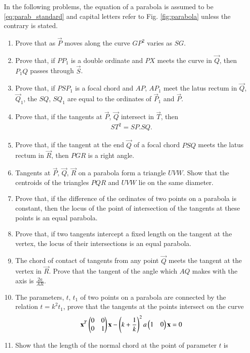In the following problems, the equation of a parabola is assumed to be \eqref{eq:parab_standard}
and capital letters refer to Fig. \ref{fig:parabola} unless the contrary is stated.
\renewcommand{\theequation}{\theenumi}
\begin{enumerate}[label=\arabic*.,ref=\thesubsection.\theenumi]
\item Prove that as $\vec{P}$ moves along the curve $GP^2$ varies as $SG$.
\item Prove that, if $PP_1$ is a double ordinate and $PX$ meets the curve in $\vec{Q}$,
then $P_1Q$ passes through $\vec{S}$.
\item Prove that, if $PSP_1$ is a focal chord and $AP$, $AP_1$ meet the latus rectum in $\vec{Q}$, $\vec{Q}_1$,
the $SQ$, $SQ_1$ are equal to the ordinates of $\vec{P}_1$ and $\vec{P}$.
\item Prove that, if the tangents at $\vec{P}$, $\vec{Q}$ intersect in $\vec{T}$, then
\begin{align}
ST^2=SP.SQ.
\end{align}
\item Prove that, if the tangent at the end $\vec{Q}$ of a focal chord $PSQ$ meets the latus rectum
in $\vec{R}$, then $PGR$ is a right angle.
\item Tangents at $\vec{P}$, $\vec{Q}$, $\vec{R}$ on a parabola form a triangle $UVW$.  Show that the centroids of
the triangles $PQR$ and $UVW$ lie on the same diameter.
\item Prove that, if the difference of the ordinates of two points on a
parabola is constant, then the locus of the point of intersection of the tangents at
these points is an equal parabola.
\item Prove that, if two tangents intercept a fixed length on the tangent at the vertex, the locus
of their intersections is an equal parabola.
\item The chord of contact of tangents from any point $\vec{Q}$ meets the tangent
at the vertex in $\vec{R}$.  Prove that the tangent of the angle which $AQ$ makes with the axis
is $\frac{2a}{AR}$.
\item The parameters, $t$, $t_1$ of two points on a parabola are
connected by the relation $t=k^2t_1$, prove that the tangents at the points intersect on the
curve
\begin{align}
\mathbf{x}^T\begin{pmatrix}0 & 0\\0 & 1\end{pmatrix}\mathbf{x}-\left(k+\frac{1}{k}\right)^2a\begin{pmatrix}1 & 0 \end{pmatrix}\mathbf{x}= 0 
\end{align}
\item Show that the length of the normal chord at the point of parameter $t$ is

\end{enumerate}
